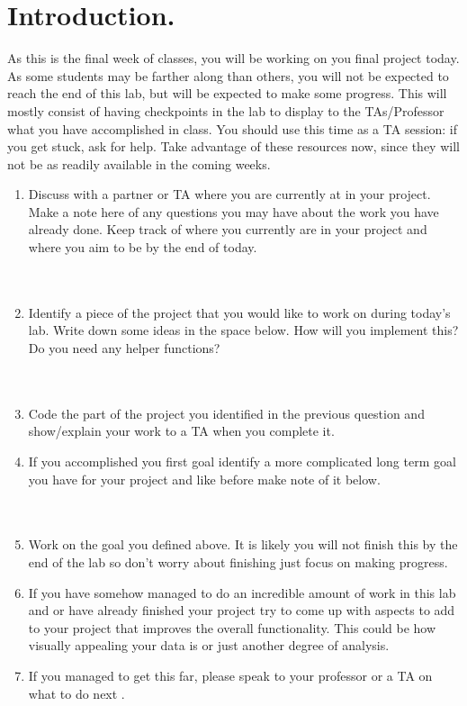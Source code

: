\documentclass[11pt, letterpaper, onecolumn, oneside, final]{article}
\begin{document}
\maketitle

\section{Introduction.} As this is the final week of classes, you will be working on you final project today. As some students may be farther along than others, you will not be expected to reach the end of this lab, but will be expected to make some progress. This will mostly consist of having checkpoints in the lab to display to the TAs/Professor what you have accomplished in class. You should use this time as a TA session: if you get stuck, ask for help. Take advantage of these resources now, since they will not be as readily available in the coming weeks. 
\begin{enumerate}
    \item Discuss with a partner or TA where you are currently at in your project. Make a note here of any questions you may have about the work you have already done. Keep track of where you currently are in your project and where you aim to be by the end of today.\\\\\\
    \item Identify a piece of the project that you would like to work on during today's lab. Write down some ideas in the space below. How will you implement this? Do you need any helper functions? 
    \\\\\\
    \item Code the part of the project you identified in the previous question and show/explain your work to a TA when you complete it.
    
    
    \item If you accomplished you first goal identify a more complicated long term goal you have for your project and like before make note of it below.\\\\\\
    
    
    \item Work on the goal you defined above. It is likely you will not finish this by the end of the lab so don't worry about finishing just focus on making progress.
    
    \item If you have somehow managed to do an incredible amount of work in this lab and or have already finished your project try to come up with aspects to add to your project that improves the overall functionality. This could be how visually appealing your data is or just another degree of analysis.
    
    \item If you managed to get this far, please speak to your professor or a TA on what to do next
    .
\end{enumerate}
\end{document}
